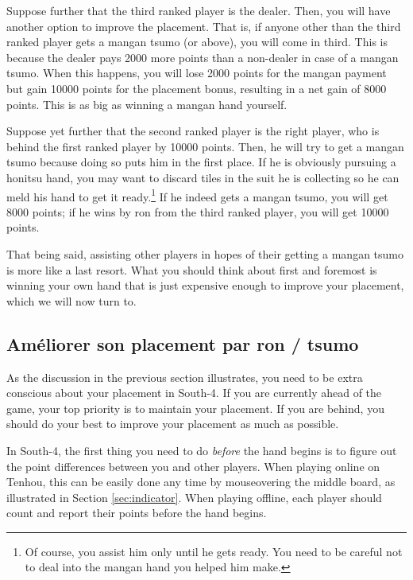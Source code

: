 \bigskip
Suppose further that the third ranked player is the dealer. Then, you will have another option to improve the placement. That is, if anyone other than the third ranked player gets a {\jap mangan tsumo} (or above), you will come in third. This is because the dealer pays 2000 more points than a non-dealer in case of a {\jap mangan tsumo}. When this happens, you will lose 2000 points for the {\jap mangan} payment but gain 10000 points for the placement bonus, resulting in a net gain of 8000 points. This is as big as winning a {\jap mangan} hand yourself.

\bigskip
Suppose yet further that the second ranked player is the right player, who is behind the first ranked player by 10000 points. Then, he will try to get a {\jap mangan tsumo} because doing so puts him in the first place. If he is obviously pursuing a {\jap honitsu} hand, you may want to discard tiles in the suit he is collecting so he can meld his hand to get it ready.\footnote{Of course, you assist him only until he gets ready. You need to be careful not to deal into the {\jap mangan} hand you helped him make.} If he indeed gets a {\jap mangan tsumo}, you will get 8000 points; if he wins by {\jap ron} from the third ranked player, you will get 10000 points. 

\bigskip
That being said, assisting other players in hopes of their getting a {\jap mangan tsumo} is more like a last resort. What you should think about first and foremost is winning your own hand that is just expensive enough to improve your placement, which we will now turn to.

\subsection*{Améliorer  son placement par {\jap ron} / {\jap tsumo}}
As the discussion in the previous section illustrates, you need to be extra conscious about your placement in South-4. If you are currently ahead of the game, your top priority is to maintain your placement. If you are behind, you should do your best to improve your placement as much as possible. 

\bigskip
In South-4, the first thing you need to do \emph{before} the hand begins is to figure out the point differences between you and other players. When playing online on {\jap Tenhou}, this can be easily done any time by mouseovering the middle board, as illustrated in Section \ref{sec:indicator}. When playing offline, each player should count and report their points before the hand begins. 


